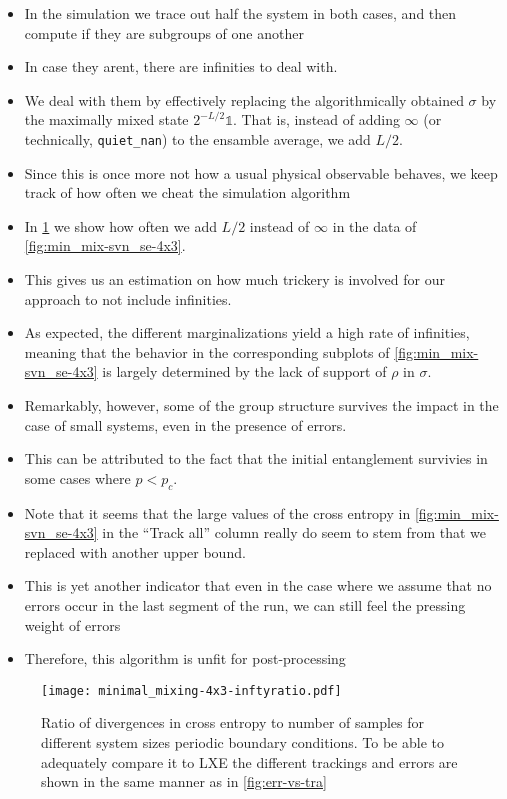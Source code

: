 \begin{itemize}
  \item In the simulation we trace out half the system in both cases, and then
    compute if they are subgroups of one another
  \item In case they arent, there are infinities to deal with.
  \item We deal with them by effectively replacing the algorithmically obtained
    $\sigma$ by the maximally mixed state $2^{-L /2} \mathds{1}$. That is,
    instead of adding $\infty$ (or technically, \texttt{quiet\_nan}) to the
    ensamble average, we add $L /2$.
  \item Since this is once more not how a usual physical observable behaves, we
    keep track of how often we cheat the simulation algorithm
  \item In \cref{fig:min_mix-inftyratio-4x3} we show how often we add $L /2$
    instead of $\infty$ in the data of \cref{fig:min_mix-svn_se-4x3}.
  \item This gives us an estimation on how much trickery is involved for our
    approach to not include infinities.
  \item As expected, the different marginalizations yield a high rate of
    infinities, meaning that the behavior in the corresponding subplots of \cref{fig:min_mix-svn_se-4x3} is
    largely determined by the lack of support of $\rho$ in $\sigma$.
  \item Remarkably, however, some of the group structure survives the impact in
    the case of small systems, even in the presence of errors.
  \item This can be attributed to the fact that the initial entanglement
    survivies in some cases where $p < p_c$.
  \item Note that it seems that the large values of the cross entropy in
    \cref{fig:min_mix-svn_se-4x3} in the \enquote{Track all} column really do
    seem to stem from that we replaced with another upper bound.
  \item This is yet another indicator that even in the case where we assume
    that no errors occur in the last segment of the run, we can still feel the
    pressing weight of errors
  \item Therefore, this algorithm is unfit for post-processing 
\end{itemize}
\begin{figure}[H]
  \centering
  \texttt{[image: minimal\_mixing-4x3-inftyratio.pdf]}
  \caption{Ratio of divergences in cross entropy to number of samples for
    different system sizes
  periodic boundary conditions. To be able to adequately compare it to LXE the
different trackings and errors are shown in the same manner as in
\cref{fig:err-vs-tra}}
  \label{fig:min_mix-inftyratio-4x3}
\end{figure}
